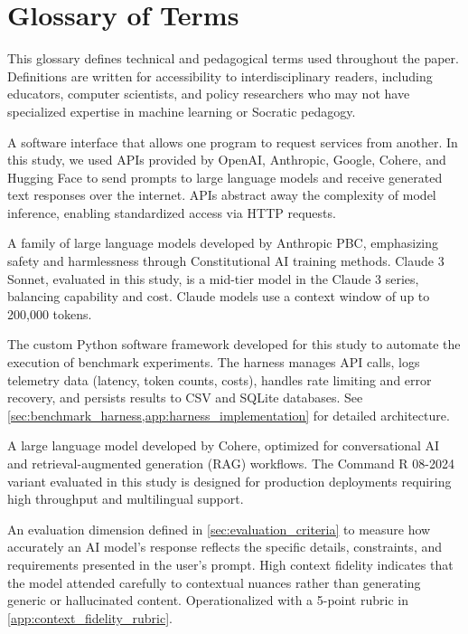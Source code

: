 \section{Glossary of Terms}\label{app:glossary}

This glossary defines technical and pedagogical terms used throughout the paper. Definitions are written for accessibility to interdisciplinary readers, including educators, computer scientists, and policy researchers who may not have specialized expertise in machine learning or Socratic pedagogy.

\begin{description}[style=nextline,leftmargin=0em,itemsep=1em]

\item[\textbf{API (Application Programming Interface)}] A software interface that allows one program to request services from another. In this study, we used APIs provided by OpenAI, Anthropic, Google, Cohere, and Hugging Face to send prompts to large language models and receive generated text responses over the internet. APIs abstract away the complexity of model inference, enabling standardized access via HTTP requests.

\item[\textbf{Anthropic Claude}] A family of large language models developed by Anthropic PBC, emphasizing safety and harmlessness through Constitutional AI training methods. Claude 3 Sonnet, evaluated in this study, is a mid-tier model in the Claude 3 series, balancing capability and cost. Claude models use a context window of up to 200,000 tokens.

\item[\textbf{Benchmark Harness}] The custom Python software framework developed for this study to automate the execution of benchmark experiments. The harness manages API calls, logs telemetry data (latency, token counts, costs), handles rate limiting and error recovery, and persists results to CSV and SQLite databases. See \cref{sec:benchmark_harness,app:harness_implementation} for detailed architecture.

\item[\textbf{Cohere Command R}] A large language model developed by Cohere, optimized for conversational AI and retrieval-augmented generation (RAG) workflows. The Command R 08-2024 variant evaluated in this study is designed for production deployments requiring high throughput and multilingual support.

\item[\textbf{Context Fidelity}] An evaluation dimension defined in \cref{sec:evaluation_criteria} to measure how accurately an AI model's response reflects the specific details, constraints, and requirements presented in the user's prompt. High context fidelity indicates that the model attended carefully to contextual nuances rather than generating generic or hallucinated content. Operationalized with a 5-point rubric in \cref{app:context_fidelity_rubric}.


\end{description}
